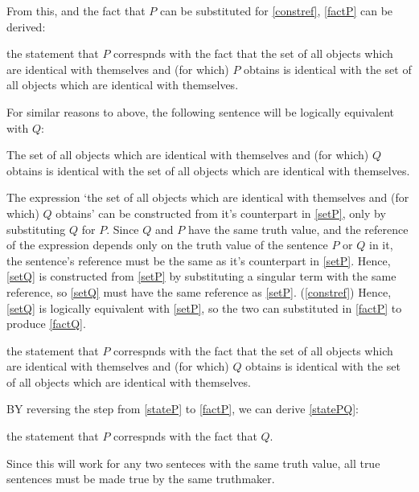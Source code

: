From this, and the fact that $P$ can be substituted for \ref{constref}, \ref{factP} can be derived:

	\begin{example} \label{factP}
	the statement that $P$ correspnds with the fact that the set of all objects which are identical with themselves and (for which) $P$ obtains is identical with the set of all objects which are identical with themselves.
	\end{example}

For similar reasons to above, the following sentence will be logically equivalent with $Q$:

	\begin{example} \label{setQ}
	The set of all objects which are identical with themselves and (for which) $Q$ obtains is identical with the set of all objects which are identical with themselves.
	\end{example}

The expression `the set of all objects which are identical with themselves and (for which) $Q$ obtains' can be constructed from it's counterpart in \ref{setP}, only by substituting $Q$ for $P$.
Since $Q$ and $P$ have the same truth value, and the reference of the expression depends only on the truth value of the sentence $P$ or $Q$ in it, the sentence's reference must be the same as it's counterpart in \ref{setP}.
Hence, \ref{setQ} is constructed from \ref{setP} by substituting a singular term with the same reference, so \ref{setQ} must have the same reference as \ref{setP}. 
(\ref{constref})
Hence, \ref{setQ} is logically equivalent with \ref{setP}, so the two can substituted in \ref{factP} to produce \ref{factQ}.


	\begin{example} \label{factQ}
	the statement that $P$ correspnds with the fact that the set of all objects which are identical with themselves and (for which) $Q$ obtains is identical with the set of all objects which are identical with themselves.
	\end{example}

BY reversing the step from \ref{stateP} to \ref{factP}, we can derive \ref{statePQ}:

	\begin{example} \label{statePQ}
	the statement that $P$ correspnds with the fact that $Q$.
	\end{example}

Since this will work for any two senteces with the same truth value, all true sentences must be made true by the same truthmaker.

